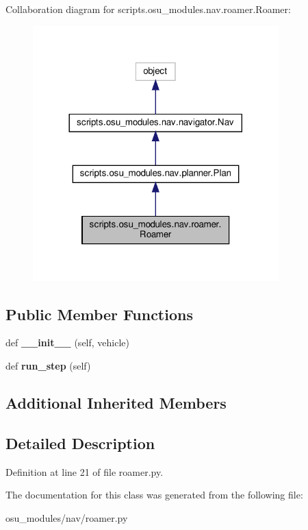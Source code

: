 Collaboration diagram for scripts.\+osu\+\_\+modules.\+nav.\+roamer.\+Roamer\+:
\nopagebreak
\begin{figure}[H]
\begin{center}
\leavevmode
\includegraphics[width=269pt]{df/d24/classscripts_1_1osu__modules_1_1nav_1_1roamer_1_1Roamer__coll__graph}
\end{center}
\end{figure}
\subsection*{Public Member Functions}
\begin{DoxyCompactItemize}
\item 
\mbox{\label{classscripts_1_1osu__modules_1_1nav_1_1roamer_1_1Roamer_a7d390a18bb34cf8ccec5dc8052f96c2f}} 
def {\bfseries \+\_\+\+\_\+init\+\_\+\+\_\+} (self, vehicle)
\item 
\mbox{\label{classscripts_1_1osu__modules_1_1nav_1_1roamer_1_1Roamer_a0cf7fcd777b2a1062cc1524f40762bfc}} 
def {\bfseries run\+\_\+step} (self)
\end{DoxyCompactItemize}
\subsection*{Additional Inherited Members}


\subsection{Detailed Description}


Definition at line 21 of file roamer.\+py.



The documentation for this class was generated from the following file\+:\begin{DoxyCompactItemize}
\item 
osu\+\_\+modules/nav/roamer.\+py\end{DoxyCompactItemize}

